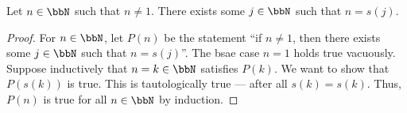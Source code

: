 \begin{lemma} \label{lemma:natural_numbers_are_either_1_or_are_successors}
    Let $n \in \bbN$ such that $n \neq 1$. There exists some $j \in \bbN$ such that $n = s(j)$. 
\end{lemma}
\begin{proof}
    For $n \in \bbN$, let $P(n)$ be the statement ``if $n \neq 1$, then there exists some $j \in \bbN$ such that $n = s(j)$''. The bsae case $n = 1$ holds true vacuously. Suppose inductively that $n = k \in \bbN$ satisfies $P(k)$. We want to show that $P(s(k))$ is true. This is tautologically true --- after all $s(k) = s(k)$. Thus, $P(n)$ is true for all $n \in \bbN$ by induction.
\end{proof}